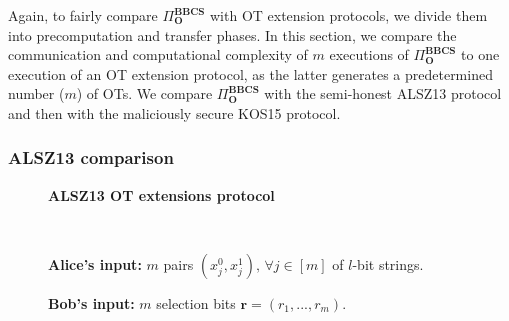Again, to fairly compare $\Pi^{\textbf{BBCS}}_{\textbf{O}}$ with OT extension protocols, we divide them into precomputation and transfer phases. In this section, we compare the communication and computational complexity of $m$ executions of $\Pi^{\textbf{BBCS}}_{\textbf{O}}$ to one execution of an OT extension protocol, as the latter generates a predetermined number ($m$) of OTs. We compare $\Pi^{\textbf{BBCS}}_{\textbf{O}}$ with the semi-honest ALSZ13 protocol and then with the maliciously secure KOS15 protocol.

\subsubsection{ALSZ13 comparison}

\begin{figure}[t]
    \centering
        \begin{tcolorbox}
                        
			\centerline{\textbf{ALSZ13 OT extensions protocol \citep{ALSZ13}}}
            
			\ 

			\textbf{Alice's input:} $m$ pairs $(x^0_j, x^1_j),\, \forall j\in[m]$ of $l$-bit strings.
            
			\textbf{Bob's input:} $m$ selection bits $\bm{r} = (r_1, ..., r_m)$.

			\
			

\end{tcolorbox}
\end{figure}
